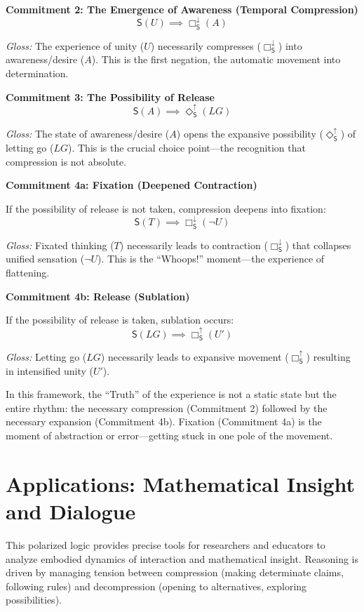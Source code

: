 \documentclass[12pt]{book}
\newcommand{\SBoxUp}{\Box_{\mathsf{S}}^{\uparrow}}
\newcommand{\SBoxDown}{\Box_{\mathsf{S}}^{\downarrow}}
\newcommand{\SDiaUp}{\Diamond_{\mathsf{S}}^{\uparrow}}
\begin{document}
\bigskip

\noindent\textbf{Commitment 2: The Emergence of Awareness (Temporal Compression)}
$$ \mathsf{S}(U) \implies \SBoxDown(A) $$

\textit{Gloss:} The experience of unity ($U$) necessarily compresses ($\SBoxDown$) into awareness/desire ($A$). This is the first negation, the automatic movement into determination.

\bigskip

\noindent\textbf{Commitment 3: The Possibility of Release}
$$ \mathsf{S}(A) \implies \SDiaUp(LG) $$

\textit{Gloss:} The state of awareness/desire ($A$) opens the expansive possibility ($\SDiaUp$) of letting go ($LG$). This is the crucial choice point---the recognition that compression is not absolute.

\bigskip

\noindent\textbf{Commitment 4a: Fixation (Deepened Contraction)}

If the possibility of release is not taken, compression deepens into fixation:
$$ \mathsf{S}(T) \implies \SBoxDown(\neg U) $$

\textit{Gloss:} Fixated thinking ($T$) necessarily leads to contraction ($\SBoxDown$) that collapses unified sensation ($\neg U$). This is the ``Whoops!'' moment---the experience of flattening.

\bigskip

\noindent\textbf{Commitment 4b: Release (Sublation)}

If the possibility of release is taken, sublation occurs:
$$ \mathsf{S}(LG) \implies \SBoxUp(U') $$

\textit{Gloss:} Letting go ($LG$) necessarily leads to expansive movement ($\SBoxUp$) resulting in intensified unity ($U'$).

\bigskip

In this framework, the ``Truth'' of the experience is not a static state but the entire rhythm: the necessary compression (Commitment 2) followed by the necessary expansion (Commitment 4b). Fixation (Commitment 4a) is the moment of abstraction or error---getting stuck in one pole of the movement.

\section{Applications: Mathematical Insight and Dialogue}

This polarized logic provides precise tools for researchers and educators to analyze embodied dynamics of interaction and mathematical insight. Reasoning is driven by managing tension between compression (making determinate claims, following rules) and decompression (opening to alternatives, exploring possibilities).
\end{document}
